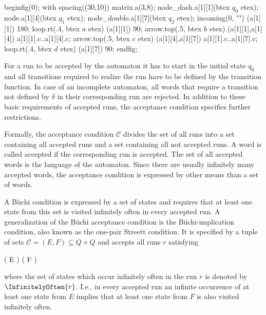 \stopsubsection


    beginfig(0);
        with spacing((30,10)) matrix.a(3,8);
        node_dash.a[1][1](btex $q_0$ etex);
        node.a[1][4](btex $q_1$ etex);
        node_double.a[1][7](btex $q_2$ etex);
        incoming(0, "") (a[1][1]) 180;
        loop.rt(.4, btex \;$a$ etex) (a[1][1]) 90;
        arrow.top(.5, btex $b$ etex) (a[1][1],a[1][4]) a[1][1].c..a[1][4].c;
        arrow.top(.5, btex $c$ etex) (a[1][4],a[1][7]) a[1][1].c..a[1][7].c;
        loop.rt(.4, btex \;$d$ etex) (a[1][7]) 90;
    endfig;
\stopreusableMPgraphic

\startsubsection[title={Acceptance Conditions}]

    For a run to be accepted by the automaton it has to start in the initial state $q_0$ and all transitions required to realize the run have to be defined by the transition function.
    In case of an incomplete automaton, all words that require a transition not defined by $\delta$ in their corresponding run are rejected.
    In addition to these basic requirements of accepted runs, the acceptance condition specifies further restrictions.

    Formally, the acceptance condition ${\mathcal C}$ divides the set of all runs into a set containing all accepted runs and a set containing all not accepted runs.
    A word is called accepted if the corresponding run is accepted.
    The set of all accepted words is the language of the automaton.
    Since there are usually infinitely many accepted words, the acceptance condition is expressed by other means than a set of words.

    A Büchi condition is expressed by a set of states and requires that at least one state from this set is visited infinitely often in every accepted run.
    A generalization of the Büchi acceptance condition is the Büchi-implication condition, also known as the one-pair Streett condition.
    It is specified by a tuple of sets $\mathcal{C} = (E, F) \subseteq Q \times Q$ and accepts all runs $r$ satisfying

    \startformula
        ( \cap E \ne \emptyset) \Longrightarrow ( \cap F \ne \emptyset) \EndComma
    \stopformula

    where the set of states which occur infinitely often in the run $r$ is denoted by $\InfinitelyOften{r}$.
    I.e., in every accepted run an infinite occurrence of at least one state from $E$ implies that at least one state from $F$ is also visited infinitely often.

